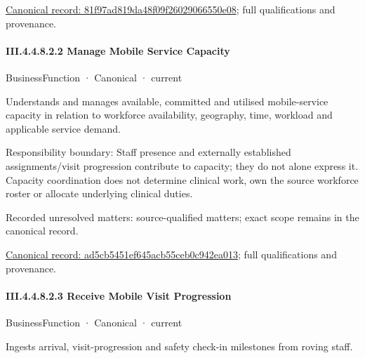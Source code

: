 {\footnotesize \href{../../../../../../../continuum/business/business-function/81f97ad819da48f09f26029066550e08.md}{Canonical record: 81f97ad819da48f09f26029066550e08}; full qualifications and provenance.}\par
\paragraph*{III.4.4.8.2.2 Manage Mobile Service Capacity}
\label{navigation:III.4.4.8.2.2}

\label{element:ad5cb5451ef645acb55ceb0c942ea013}
{\small BusinessFunction · Canonical · current}\par

Understands and manages available, committed and utilised mobile-service capacity in relation to workforce availability, geography, time, workload and applicable service demand.



Responsibility boundary: Staff presence and externally established assignments/visit progression contribute to capacity; they do not alone express it. Capacity coordination does not determine clinical work, own the source workforce roster or allocate underlying clinical duties.


{\small Recorded unresolved matters: source-qualified matters; exact scope remains in the canonical record.}\par
{\footnotesize \href{../../../../../../../continuum/business/business-function/ad5cb5451ef645acb55ceb0c942ea013.md}{Canonical record: ad5cb5451ef645acb55ceb0c942ea013}; full qualifications and provenance.}\par
\paragraph*{III.4.4.8.2.3 Receive Mobile Visit Progression}
\label{navigation:III.4.4.8.2.3}

\label{element:71700f211ef4403f98a2b9b11d8d7848}
{\small BusinessFunction · Canonical · current}\par

Ingests arrival, visit-progression and safety check-in milestones from roving staff.



